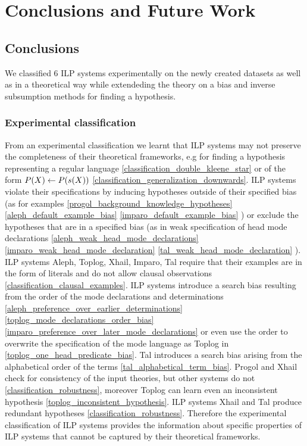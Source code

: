 \chapter{Conclusions and Future Work}\label{ch:conclusions}

\section{Conclusions}
We classified 6 ILP systems experimentally on the newly created datasets as well as in a theoretical way while extendeding the theory on a bias and inverse subsumption methods for finding a hypothesis.

\subsection{Experimental classification}
From an experimental classification we learnt that ILP systems may not preserve the completeness of their theoretical frameworks, e.g for finding a hypothesis representing a regular language \ref{classification_double_kleene_star} or of the form $P(X) \leftarrow P(s(X))$ \ref{classification_generalization_downwards}.
ILP systems violate their specifications by inducing hypotheses outside of their specified bias (as for examples
\ref{progol_background_knowledge_hypotheses}
\ref{aleph_default_example_bias}
\ref{imparo_default_example_bias}
) or exclude the hypotheses that are in a specified bias (as in weak specification of head mode declarations
\ref{aleph_weak_head_mode_declarations}
\ref{imparo_weak_head_mode_declaration}
\ref{tal_weak_head_mode_declaration}
).
ILP systems Aleph, Toplog, Xhail, Imparo, Tal require that their examples are in the form of literals and do not allow clausal observations \ref{classification_clausal_examples}.
ILP systems introduce a search bias resulting from the order of the mode declarations and determinations 
\ref{aleph_preference_over_earlier_determinations}
\ref{toplog_mode_declarations_order_bias}
\ref{imparo_preference_over_later_mode_declarations}
 or
even use the order to overwrite the specification of the mode language as Toplog in \ref{toplog_one_head_predicate_bias}.
Tal introduces a search bias arising from the alphabetical order of the terms \ref{tal_alphabetical_term_bias}.
Progol and Xhail check for consistency of the input theories, but other systems do not \ref{classification_robustness}, moreover Toplog can learn even an inconsistent hypothesis \ref{toplog_inconsistent_hypothesis}.
ILP systems Xhail and Tal produce redundant hypotheses \ref{classification_robustness}. Therefore the experimental classification of ILP systems provides the information about specific properties of ILP systems that cannot be captured by their theoretical frameworks.

